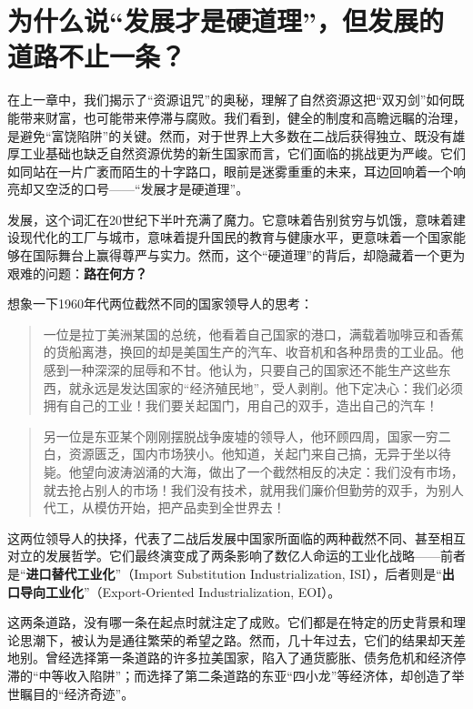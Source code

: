 \chapter{为什么说“发展才是硬道理”，但发展的道路不止一条？}

在上一章中，我们揭示了“资源诅咒”的奥秘，理解了自然资源这把“双刃剑”如何既能带来财富，也可能带来停滞与腐败。我们看到，健全的制度和高瞻远瞩的治理，是避免“富饶陷阱”的关键。然而，对于世界上大多数在二战后获得独立、既没有雄厚工业基础也缺乏自然资源优势的新生国家而言，它们面临的挑战更为严峻。它们如同站在一片广袤而陌生的十字路口，眼前是迷雾重重的未来，耳边回响着一个响亮却又空泛的口号——“发展才是硬道理”。

发展，这个词汇在20世纪下半叶充满了魔力。它意味着告别贫穷与饥饿，意味着建设现代化的工厂与城市，意味着提升国民的教育与健康水平，更意味着一个国家能够在国际舞台上赢得尊严与实力。然而，这个“硬道理”的背后，却隐藏着一个更为艰难的问题：\textbf{路在何方？}

想象一下1960年代两位截然不同的国家领导人的思考：

\begin{quote}
一位是拉丁美洲某国的总统，他看着自己国家的港口，满载着咖啡豆和香蕉的货船离港，换回的却是美国生产的汽车、收音机和各种昂贵的工业品。他感到一种深深的屈辱和不甘。他认为，只要自己的国家还不能生产这些东西，就永远是发达国家的“经济殖民地”，受人剥削。他下定决心：我们必须拥有自己的工业！我们要关起国门，用自己的双手，造出自己的汽车！
\end{quote}

\begin{quote}
另一位是东亚某个刚刚摆脱战争废墟的领导人，他环顾四周，国家一穷二白，资源匮乏，国内市场狭小。他知道，关起门来自己搞，无异于坐以待毙。他望向波涛汹涌的大海，做出了一个截然相反的决定：我们没有市场，就去抢占别人的市场！我们没有技术，就用我们廉价但勤劳的双手，为别人代工，从模仿开始，把产品卖到全世界去！
\end{quote}

这两位领导人的抉择，代表了二战后发展中国家所面临的两种截然不同、甚至相互对立的发展哲学。它们最终演变成了两条影响了数亿人命运的工业化战略——前者是“\textbf{进口替代工业化}”（Import Substitution Industrialization, ISI），后者则是“\textbf{出口导向工业化}”（Export-Oriented Industrialization, EOI）。

这两条道路，没有哪一条在起点时就注定了成败。它们都是在特定的历史背景和理论思潮下，被认为是通往繁荣的希望之路。然而，几十年过去，它们的结果却天差地别。曾经选择第一条道路的许多拉美国家，陷入了通货膨胀、债务危机和经济停滞的“中等收入陷阱”；而选择了第二条道路的东亚“四小龙”等经济体，却创造了举世瞩目的“经济奇迹”。


